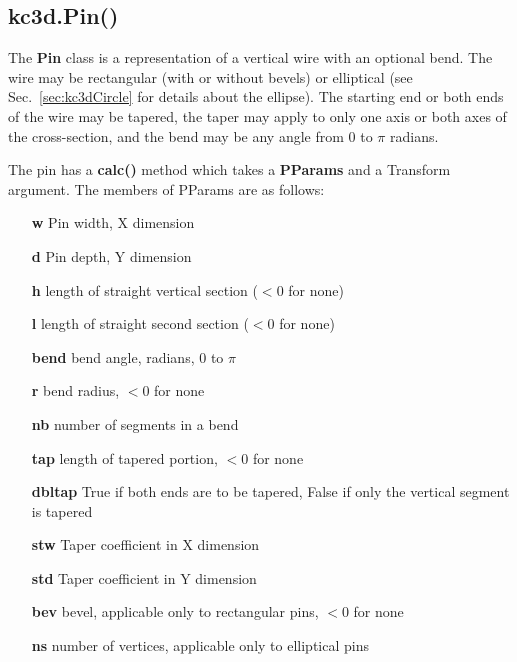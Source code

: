 \documentclass[a4paper, dvipdfm]{article}
\begin{document}
\subsection{kc3d.Pin()}
The \textbf{Pin} class is a representation of a vertical wire with an optional bend. The wire
may be rectangular (with or without bevels) or elliptical (see Sec.~\ref{sec:kc3dCircle} for
details about the ellipse). The starting end or both ends of the wire may be tapered, the taper
may apply to only one axis or both axes of the cross-section, and the bend may be any angle
from 0 to $\pi$ radians. 

The pin has a \textbf{calc()} method which takes a \textbf{PParams} and a Transform
argument. The members of PParams are as follows:

\begin{itemize}
\item[\textbf{w}] Pin width, X dimension\\
\item[\textbf{d}] Pin depth, Y dimension\\
\item[\textbf{h}] length of straight vertical section ($<0$ for none)\\
\item[\textbf{l}] length of straight second section ($<0$ for none)\\
\item[\textbf{bend}] bend angle, radians, $0$ to $\pi$\\
\item[\textbf{r}] bend radius, $<0$ for none\\
\item[\textbf{nb}] number of segments in a bend\\
\item[\textbf{tap}] length of tapered portion, $<0$ for none\\
\item[\textbf{dbltap}] True if both ends are to be tapered, False if only the vertical segment is tapered\\
\item[\textbf{stw}] Taper coefficient in X dimension\\
\item[\textbf{std}] Taper coefficient in Y dimension\\
\item[\textbf{bev}] bevel, applicable only to rectangular pins, $<0$ for none\\
\item[\textbf{ns}] number of vertices, applicable only to elliptical pins\\
\end{itemize}
\end{document}
